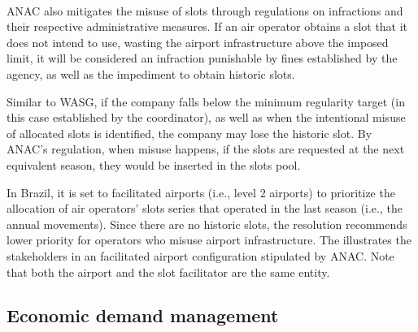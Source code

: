 \\



\acrshort{ANAC} also mitigates the misuse of slots through regulations on
infractions and their respective administrative measures.
%
If an air operator obtains a slot that it does not intend to use, wasting the
airport infrastructure above the imposed limit, it will be considered an
infraction punishable by fines established by the agency, as well as the
impediment to obtain historic slots.



Similar to \acrshort{WASG}, if the company falls below the minimum regularity
target (in this case established by the coordinator), as well as when the
intentional misuse of allocated slots is identified, the company may lose the
historic slot.
%
By \acrshort{ANAC}’s regulation, when misuse happens, if the slots are
requested at the next equivalent season, they would be inserted in the slots
pool.




In Brazil, it is set to facilitated airports (i.e., level 2 airports) to
prioritize the allocation of air operators’ slots series that operated in the
last season (i.e., the annual movements).
%
Since there are no historic slots, the resolution recommends lower priority for
operators who misuse airport infrastructure.
%
The  illustrates the stakeholders in an
facilitated airport configuration stipulated by \acrshort{ANAC}.
%
Note that both the airport and the slot facilitator are the same entity.







\subsection{Economic demand management}
\label{subsec:EcoDemMan}



